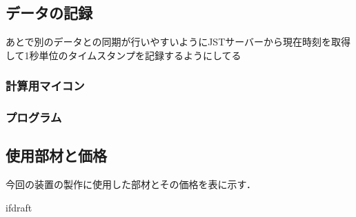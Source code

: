\subsection{データの記録}

あとで別のデータとの同期が行いやすいようにJSTサーバーから現在時刻を取得して1秒単位のタイムスタンプを記録するようにしてる

\subsubsection{計算用マイコン}

\subsubsection{プログラム}

\subsection{使用部材と価格}

今回の装置の製作に使用した部材とその価格を表に示す．

\expandafter\ifx\csname ifdraft\endcsname\relax
  
\fi
